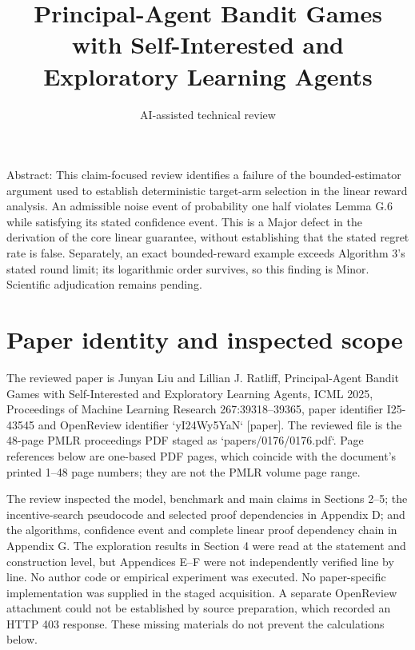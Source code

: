 \documentclass[10pt]{article}
\title{Principal-Agent Bandit Games with Self-Interested and Exploratory Learning Agents}
\author{AI-assisted technical review}
\date{}
\begin{document}
\maketitle
Abstract: This claim-focused review identifies a failure of the bounded-estimator argument used to establish deterministic target-arm selection in the linear reward analysis. An admissible noise event of probability one half violates Lemma G.6 while satisfying its stated confidence event. This is a Major defect in the derivation of the core linear guarantee, without establishing that the stated regret rate is false. Separately, an exact bounded-reward example exceeds Algorithm 3’s stated round limit; its logarithmic order survives, so this finding is Minor. Scientific adjudication remains pending.\par
\section*{Paper identity and inspected scope}
The reviewed paper is Junyan Liu and Lillian J. Ratliff, Principal-Agent Bandit Games with Self-Interested and Exploratory Learning Agents, ICML 2025, Proceedings of Machine Learning Research 267:39318–39365, paper identifier I25-43545 and OpenReview identifier `yI24Wy5YaN` [paper]. The reviewed file is the 48-page PMLR proceedings PDF staged as `papers/0176/0176.pdf`. Page references below are one-based PDF pages, which coincide with the document’s printed 1–48 page numbers; they are not the PMLR volume page range.\par
The review inspected the model, benchmark and main claims in Sections 2–5; the incentive-search pseudocode and selected proof dependencies in Appendix D; and the algorithms, confidence event and complete linear proof dependency chain in Appendix G. The exploration results in Section 4 were read at the statement and construction level, but Appendices E–F were not independently verified line by line. No author code or empirical experiment was executed. No paper-specific implementation was supplied in the staged acquisition. A separate OpenReview attachment could not be established by source preparation, which recorded an HTTP 403 response. These missing materials do not prevent the calculations below.\par
\end{document}
